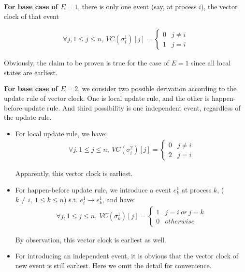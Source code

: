 \documentclass[11pt,a4paper]{article}
\begin{document}
    \textbf{For base case of $E = 1$}, there is only one event (say, at process $i$), the vector
    clock of that event 
        
    \begin{eqnarray}
        \forall j, 1 \leq j \leq n,\ VC(\sigma_i^1)[j] =
        \begin{cases}
        0                   & j \neq i \\
        1                   & j = i
        \end{cases}
    \end{eqnarray}
    
    Obviously, the claim to be proven is true for the case of $E = 1$ since all local
    states are earliest.

    \textbf{For base case of $E = 2$}, we consider two possible derivation according to the update
    rule of vector clock. One is local update rule, and the other is
    happen-before update rule. And third possibility is one independent event,
    regardless of the update rule.

    \begin{itemize}

        \item{For local update rule, we have: }
    \begin{eqnarray}
       \forall j, 1 \leq j \leq n,\ VC(\sigma_i^2)[j] = 
        \begin{cases}
            0   & j \neq i \\
            2   & j = i
        \end{cases}
    \end{eqnarray}

    Apparently, this vector clock is earliest.
    
\item{For happen-before update rule, we introduce a event $e_k^1$ at process
        $k$, ($k \neq i,\ 1 \leq k \leq n$) s.t. $e_i^1
        \rightarrow e_k^1$, and have: }
    \begin{eqnarray}
       \forall j, 1 \leq j \leq n,\  VC(\sigma_k^1)[j] = 
        \begin{cases}
            1   & j = i\ or\ j = k \\
            0   & otherwise
        \end{cases}
    \end{eqnarray}

    By observation, this vector clock is earliest as well.

\item{For introducing an independent event, it is obvious that the vector clock
        of new event is still earliest. Here we omit the detail for convenience.}
    \end{itemize}
\end{document}

